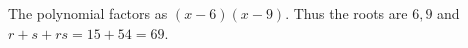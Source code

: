 The polynomial factors as $(x-6)(x-9)$. Thus the roots are $\boxed{6,9}$ and $r+s+rs=15+54=\boxed{69}$.
